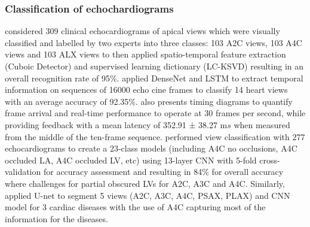 \documentclass[mlabstract,twocolumn]{jmlr}
\begin{document}
\subsubsection{Classification of echochardiograms} \label{subsec:Nets_echochardiograms}
\citet{khamis2017} considered 309 clinical echocardiograms of apical views which were visually classified and labelled by two experts into three classes: 103 A2C views, 103 A4C views and 103 ALX views to then applied spatio-temporal feature extraction (Cuboic Detector) and supervised learning dictionary (LC-KSVD) resulting in an overall recognition rate of 95\%.
\citet{woudenberg2018} applied DenseNet and LSTM to extract temporal information on sequences of 16000 echo cine frames to classify 14 heart views with an average accuracy of 92.35\%.
\citet{woudenberg2018} also presents timing diagrams to quantify frame arrival and real-time performance to operate at 30 frames per second, while providing feedback with a mean latency of 352.91 ± 38.27 m$s$ when measured from the middle of the ten-frame sequence.
\citet{zhang2018} performed view classification with 277 echocardiograms to create a 23-class models (including A4C no occlusions, A4C occluded LA, A4C occluded LV, etc) using 13-layer CNN with 5-fold cross-validation for accuracy assessment and resulting in 84\% for overall accuracy where challenges for partial obscured LVs for A2C, A3C and A4C.
Similarly, \citet{zhang2018} applied U-net to segment 5 views (A2C, A3C, A4C, PSAX, PLAX) and CNN model for 3 cardiac diseases with the use of A4C capturing most of the information for the diseases.
\end{document}
